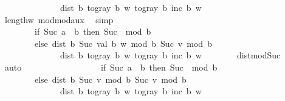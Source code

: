\begin{isabellebody}
\ \ \ \ \ \ \ \ \ \ \ \ \ {\isacharplus}{\kern0pt}\ dist\ b\ {\isacharparenleft}{\kern0pt}to{\isacharunderscore}{\kern0pt}gray\ b\ w{\isacharparenright}{\kern0pt}\ {\isacharparenleft}{\kern0pt}to{\isacharunderscore}{\kern0pt}gray\ b\ {\isacharparenleft}{\kern0pt}inc\ b\ w{\isacharparenright}{\kern0pt}{\isacharparenright}{\kern0pt}{\isacharparenright}{\kern0pt}{\isachardoublequoteclose}\isanewline
\ \ \ \ \ \ \isamarkupfalse%
\ {\isacartoucheopen}{}{\isasymle}length{\isacharparenleft}{\kern0pt}w{\isacharparenright}{\kern0pt}{\isacartoucheclose}\ mod{\isacharunderscore}{\kern0pt}mod{\isacharunderscore}{\kern0pt}aux\ \isamarkupfalse%
\ simp\isanewline
\ \ \ \ \isamarkupfalse%
\ \isamarkupfalse%
\ {\isachardoublequoteopen}{\isachardot}{\kern0pt}{\isachardot}{\kern0pt}{\isachardot}{\kern0pt}\ {\isacharequal}{\kern0pt}\ {\isacharparenleft}{\kern0pt}\isanewline
\ \ \ \ \ \ \ \ if\ Suc\ a\ {\isasymnoteq}\ b\ then\ Suc\ {}\ mod\ b\isanewline
\ \ \ \ \ \ \ \ else\ dist{}\ b\ {\isacharparenleft}{\kern0pt}Suc\ {\isacharparenleft}{\kern0pt}val\ b\ w{\isacharparenright}{\kern0pt}\ mod\ b{\isacharparenright}{\kern0pt}\ {\isacharparenleft}{\kern0pt}Suc\ {\isacharquery}{\kern0pt}v\ mod\ b{\isacharparenright}{\kern0pt}\isanewline
\ \ \ \ \ \ \ \ \ \ \ \ \ {\isacharplus}{\kern0pt}\ dist\ b\ {\isacharparenleft}{\kern0pt}to{\isacharunderscore}{\kern0pt}gray\ b\ w{\isacharparenright}{\kern0pt}\ {\isacharparenleft}{\kern0pt}to{\isacharunderscore}{\kern0pt}gray\ b\ {\isacharparenleft}{\kern0pt}inc\ b\ w{\isacharparenright}{\kern0pt}{\isacharparenright}{\kern0pt}{\isacharparenright}{\kern0pt}{\isachardoublequoteclose}\isanewline
\ \ \ \ \ \ \isamarkupfalse%
\ dist{}{\isacharunderscore}{\kern0pt}mod{\isacharunderscore}{\kern0pt}Suc\ \isamarkupfalse%
\ auto\isanewline
\ \ \ \ \isamarkupfalse%
\ \isamarkupfalse%
\ {\isachardoublequoteopen}{\isachardot}{\kern0pt}{\isachardot}{\kern0pt}{\isachardot}{\kern0pt}\ {\isacharequal}{\kern0pt}\ {\isacharparenleft}{\kern0pt}\isanewline
\ \ \ \ \ \ \ \ if\ Suc\ a\ {\isasymnoteq}\ b\ then\ Suc\ {}\ mod\ b\isanewline
\ \ \ \ \ \ \ \ else\ dist{}\ b\ {\isacharparenleft}{\kern0pt}Suc\ {\isacharquery}{\kern0pt}v\ mod\ b{\isacharparenright}{\kern0pt}\ {\isacharparenleft}{\kern0pt}Suc\ {\isacharquery}{\kern0pt}v\ mod\ b{\isacharparenright}{\kern0pt}\isanewline
\ \ \ \ \ \ \ \ \ \ \ \ \ {\isacharplus}{\kern0pt}\ dist\ b\ {\isacharparenleft}{\kern0pt}to{\isacharunderscore}{\kern0pt}gray\ b\ w{\isacharparenright}{\kern0pt}\ {\isacharparenleft}{\kern0pt}to{\isacharunderscore}{\kern0pt}gray\ b\ {\isacharparenleft}{\kern0pt}inc\ b\ w{\isacharparenright}{\kern0pt}{\isacharparenright}{\kern0pt}{\isacharparenright}{\kern0pt}{\isachardoublequoteclose}\isanewline

\end{isabellebody}
